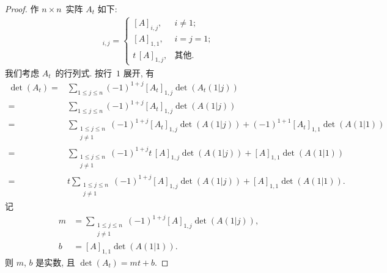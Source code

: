 \begin{proof}
    作 \(n \times n\)~实阵 \(A_t\) 如下:
    \begin{align*}
        [A_t]_{i,j} =
        \begin{cases}
            [A]_{i,j},     & i \neq 1;  \\
            [A]_{1,1},     & i = j = 1; \\
            t\, [A]_{1,j}, & \text{其他}.
        \end{cases}
    \end{align*}
    我们考虑 \(A_t\)~的行列式.
    按行~\(1\) 展开, 有
    \begin{align*}
        \det {(A_t)}
        = {} &
        \sum_{1 \leq j \leq n}
        {(-1)^{1 + j} [A_t]_{1,j} \det {(A_t (1 | j))}}
        \\
        = {} &
        \sum_{1 \leq j \leq n}
        {(-1)^{1 + j} [A_t]_{1,j} \det {(A (1 | j))}}
        \\
        = {} &
        \sum_{\substack{1 \leq j \leq n \\j \neq 1}}
        {(-1)^{1 + j} [A_t]_{1,j} \det {(A (1 | j))}}
        +
        (-1)^{1 + 1} [A_t]_{1,1} \det {(A (1 | 1))}
        \\
        = {} &
        \sum_{\substack{1 \leq j \leq n \\j \neq 1}}
        {(-1)^{1 + j} t\, [A]_{1,j} \det {(A (1 | j))}}
        +
        [A]_{1,1} \det {(A (1 | 1))}
        \\
        = {} &
        t
        \sum_{\substack{1 \leq j \leq n \\j \neq 1}}
        {(-1)^{1 + j} [A]_{1,j} \det {(A (1 | j))}}
        +
        [A]_{1,1} \det {(A (1 | 1))}.
    \end{align*}
    记
    \begin{align*}
        m & =
        \sum_{\substack{1 \leq j \leq n \\j \neq 1}}
        {(-1)^{1 + j} [A]_{1,j} \det {(A (1 | j))}},
        \\
        b & =
        [A]_{1,1} \det {(A (1 | 1))}.
    \end{align*}
    则 \(m\), \(b\) 是实数, 且
    \(\det {(A_t)} = mt + b\).


\end{proof}
